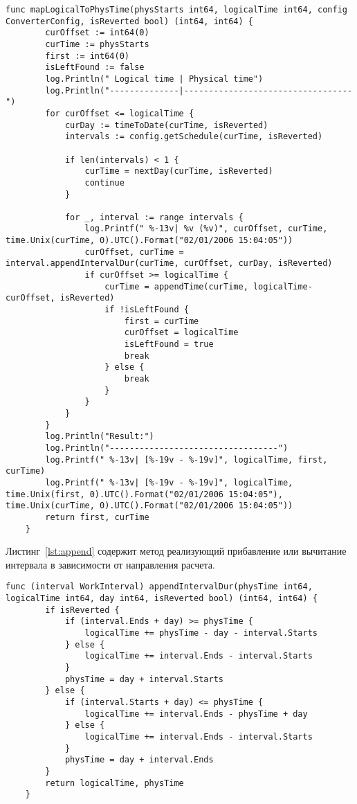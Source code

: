 \begin{lstlisting}[language=Golang,caption={Алгоритм отображения},label=lst:map]
	func mapLogicalToPhysTime(physStarts int64, logicalTime int64, config ConverterConfig, isReverted bool) (int64, int64) {
		curOffset := int64(0)
		curTime := physStarts
		first := int64(0)
		isLeftFound := false
		log.Println(" Logical time | Physical time")
		log.Println("--------------|----------------------------------")
		for curOffset <= logicalTime {
			curDay := timeToDate(curTime, isReverted)
			intervals := config.getSchedule(curTime, isReverted)
	
			if len(intervals) < 1 {
				curTime = nextDay(curTime, isReverted)
				continue
			}
	
			for _, interval := range intervals {
				log.Printf(" %-13v| %v (%v)", curOffset, curTime, time.Unix(curTime, 0).UTC().Format("02/01/2006 15:04:05"))
				curOffset, curTime = interval.appendIntervalDur(curTime, curOffset, curDay, isReverted)
				if curOffset >= logicalTime {
					curTime = appendTime(curTime, logicalTime-curOffset, isReverted)
					if !isLeftFound {
						first = curTime
						curOffset = logicalTime
						isLeftFound = true
						break
					} else {
						break
					}
				}
			}
		}
		log.Println("Result:")
		log.Println("----------------------------------")
		log.Printf(" %-13v| [%-19v - %-19v]", logicalTime, first, curTime)
		log.Printf(" %-13v| [%-19v - %-19v]", logicalTime, time.Unix(first, 0).UTC().Format("02/01/2006 15:04:05"), time.Unix(curTime, 0).UTC().Format("02/01/2006 15:04:05"))
		return first, curTime
	}
\end{lstlisting}

Листинг~\ref{lst:append} содержит метод реализующий прибавление или вычитание интервала в зависимости от направления расчета.

\begin{lstlisting}[language=Golang,caption={Добавление рабочего интервала},label=lst:append]
	func (interval WorkInterval) appendIntervalDur(physTime int64, logicalTime int64, day int64, isReverted bool) (int64, int64) {
		if isReverted {
			if (interval.Ends + day) >= physTime {
				logicalTime += physTime - day - interval.Starts
			} else {
				logicalTime += interval.Ends - interval.Starts
			}
			physTime = day + interval.Starts
		} else {
			if (interval.Starts + day) <= physTime {
				logicalTime += interval.Ends - physTime + day
			} else {
				logicalTime += interval.Ends - interval.Starts
			}
			physTime = day + interval.Ends
		}
		return logicalTime, physTime
	}
\end{lstlisting}


